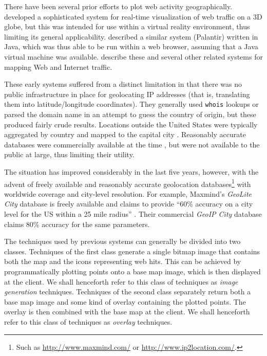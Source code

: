 \documentclass[acmtocl,acmnow]{acmtrans2m}
\begin{document}
There have been several prior efforts to plot web activity
geographically.  developed a sophisticated
system for real-time visualization of web traffic on a 3D globe, but
this was intended for use within a virtual reality environment, thus
limiting its general applicability. 
described a similar system (Palantir) written in Java, which was thus
able to be run within a web browser, assuming that a Java virtual
machine was available. 
describe these and several other related systems for mapping Web and
Internet traffic.

These early systems suffered from a distinct limitation in that there
was no public infrastructure in place for geolocating IP addresses (that
is, translating them into latitude/longitude coordinates). They
generally used \texttt{whois} lookups or parsed the domain name in an
attempt to guess the country of origin, but these produced fairly crude
results. Locations outside the United States were typically aggregated
by country and mapped to the capital city
\cite{Lamm-SE-1996-webvis,Papa-N-1998-Palantir,Jian-B-2000-cybermap}.
Reasonably accurate databases were commercially available at the time
\cite[p.\ 1466]{Lamm-SE-1996-webvis}, but were not available to the
public at large, thus limiting their utility.

The situation has improved considerably in the last five years, however,
with the advent of freely available and reasonably accurate geolocation
databases\footnote{Such as \url{http://www.maxmind.com/} or
\url{http://www.ip2location.com/}.} with worldwide coverage and
city-level resolution. For example, Maxmind's \emph{GeoLite City}
database is freely available and claims to provide ``60\% accuracy on a
city level for the US within a 25 mile radius''
\cite{Maxm-G-2006-GeoLiteCity}. Their commercial \emph{GeoIP City}
database claims 80\% accuracy for the same parameters.

The techniques used by previous systems can generally be divided into two
classes. Techniques of the first class generate a single bitmap image that
contains both the map and the icons representing web hits. This can be
achieved by programmatically plotting points onto a base map image,
which is then displayed at the client. We shall henceforth refer to this
class of techniques as \emph{image generation} techniques. Techniques of the
second class separately return both a base map image and some kind of
overlay containing the plotted points. The overlay is then combined with
the base map at the client. We shall henceforth refer to this class of
techniques as \emph{overlay} techniques.
\end{document}
